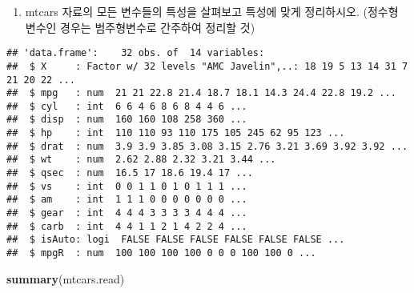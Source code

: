 \documentclass[]{article}
\newenvironment{Shaded}{\begin{snugshade}}{\end{snugshade}}
\newcommand{\KeywordTok}[1]{\textcolor[rgb]{0.13,0.29,0.53}{\textbf{#1}}}
\newcommand{\CommentTok}[1]{\textcolor[rgb]{0.56,0.35,0.01}{\textit{#1}}}
\newcommand{\NormalTok}[1]{#1}
\providecommand{\tightlist}{%
  \setlength{\itemsep}{0pt}\setlength{\parskip}{0pt}}
\begin{document}
\begin{enumerate}
\def\labelenumi{\arabic{enumi})}
\setcounter{enumi}{7}
\tightlist
\item
  mtcars 자료의 모든 변수들의 특성을 살펴보고 특성에 맞게 정리하시오.
  (정수형 변수인 경우는 범주형변수로 간주하여 정리할 것)
\end{enumerate}

\begin{Shaded}
\end{Shaded}

\begin{verbatim}
## 'data.frame':    32 obs. of  14 variables:
##  $ X     : Factor w/ 32 levels "AMC Javelin",..: 18 19 5 13 14 31 7 21 20 22 ...
##  $ mpg   : num  21 21 22.8 21.4 18.7 18.1 14.3 24.4 22.8 19.2 ...
##  $ cyl   : int  6 6 4 6 8 6 8 4 4 6 ...
##  $ disp  : num  160 160 108 258 360 ...
##  $ hp    : int  110 110 93 110 175 105 245 62 95 123 ...
##  $ drat  : num  3.9 3.9 3.85 3.08 3.15 2.76 3.21 3.69 3.92 3.92 ...
##  $ wt    : num  2.62 2.88 2.32 3.21 3.44 ...
##  $ qsec  : num  16.5 17 18.6 19.4 17 ...
##  $ vs    : int  0 0 1 1 0 1 0 1 1 1 ...
##  $ am    : int  1 1 1 0 0 0 0 0 0 0 ...
##  $ gear  : int  4 4 4 3 3 3 3 4 4 4 ...
##  $ carb  : int  4 4 1 1 2 1 4 2 2 4 ...
##  $ isAuto: logi  FALSE FALSE FALSE FALSE FALSE FALSE ...
##  $ mpgR  : num  100 100 100 100 0 0 0 100 100 0 ...
\end{verbatim}

\begin{Shaded}
\begin{Highlighting}[]
\KeywordTok{summary}\NormalTok{(mtcars.read)}
\end{Highlighting}
\end{Shaded}
\end{document}
